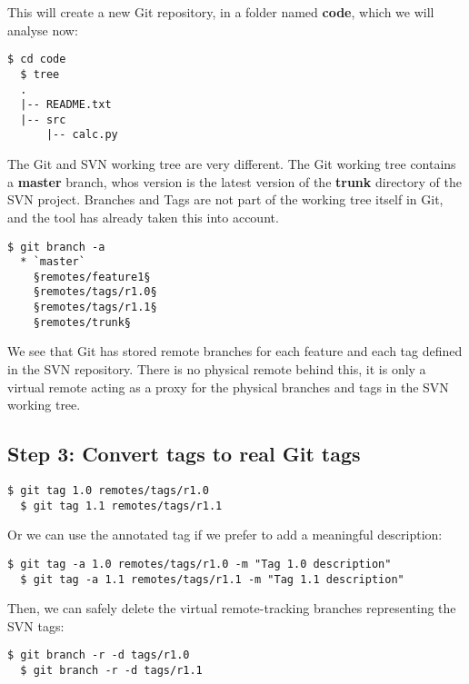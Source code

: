 \documentclass{../../common/tufte-latex/tufte-handout}
\begin{document}
This will create a new Git repository, in a folder named \textbf{code}, which we will analyse now:

\begin{lstlisting}[style=BashInputStyle]
  $ cd code
  $ tree
  .
  |-- README.txt
  |-- src
      |-- calc.py
\end{lstlisting}

The Git and SVN working tree are very different.
The Git working tree contains a \textbf{master} branch, whos version is the latest version of the \textbf{trunk} directory of the SVN project.
Branches and Tags are not part of the working tree itself in Git, and the tool has already taken this into account.

\begin{lstlisting}[style=BashInputStyle]
  $ git branch -a
  * `master`
    §remotes/feature1§
    §remotes/tags/r1.0§
    §remotes/tags/r1.1§
    §remotes/trunk§
\end{lstlisting}

We see that Git has stored remote branches for each feature and each tag defined in the SVN repository.
There is no physical remote behind this, it is only a virtual remote acting as a proxy for the physical branches and tags in the SVN working tree.

\subsection{Step 3: Convert tags to real Git tags}

\begin{lstlisting}[style=BashInputStyle]
  $ git tag 1.0 remotes/tags/r1.0
  $ git tag 1.1 remotes/tags/r1.1
\end{lstlisting}

Or we can use the annotated tag if we prefer to add a meaningful description:

\begin{lstlisting}[style=BashInputStyle]
  $ git tag -a 1.0 remotes/tags/r1.0 -m "Tag 1.0 description"
  $ git tag -a 1.1 remotes/tags/r1.1 -m "Tag 1.1 description"
\end{lstlisting}

Then, we can safely delete the virtual remote-tracking branches representing the SVN tags:

\begin{lstlisting}[style=BashInputStyle]
  $ git branch -r -d tags/r1.0
  $ git branch -r -d tags/r1.1
\end{lstlisting}
\end{document}
